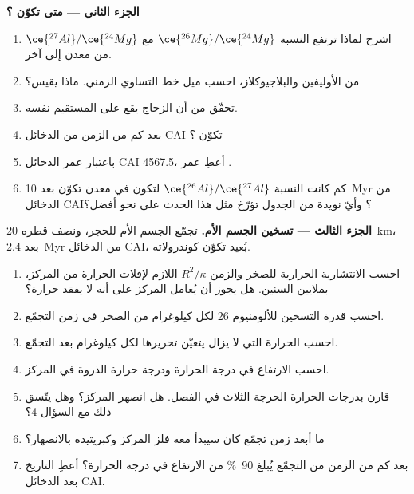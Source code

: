 \begin{problem}
\noindent\textbf{الجزء الثاني --- متى تكوّن ؟}
\begin{enumerate}[resume]
  \item اشرح لماذا ترتفع النسبة $\ce{^{26}Mg}/\ce{^{24}Mg}$ مع
        $\ce{^{27}Al}/\ce{^{24}Mg}$ من معدن إلى آخر.
  \item من الأوليفين والبلاجيوكلاز، احسب ميل خط التساوي الزمني.
        ماذا يقيس؟
  \item تحقّق من أن الزجاج يقع على المستقيم نفسه.
  \item بعد كم من الزمن من الدخائل CAI تكوّن ؟
  \item باعتبار عمر الدخائل CAI \qty{4567.5}{\Ma}، أعطِ عمر .
  \item كم كانت النسبة $\ce{^{26}Al}/\ce{^{27}Al}$ لتكون في معدن تكوّن
        بعد \qty{10}{Myr} من الدخائل CAI؟ وأيّ نويدة من الجدول تؤرّخ مثل هذا
        الحدث على نحو أفضل؟
\end{enumerate}

\noindent\textbf{الجزء الثالث --- تسخين الجسم الأم.}
تجمّع الجسم الأم للحجر، ونصف قطره \qty{20}{km}، بعد \qty{2.4}{Myr} من
الدخائل CAI، بُعيد تكوّن كوندرولاته.
\begin{enumerate}[resume]
  \item احسب الانتشارية الحرارية للصخر والزمن $R^2/\kappa$ اللازم
        لإفلات الحرارة من المركز، بملايين السنين. هل يجوز أن يُعامل المركز
        على أنه لا يفقد حرارة؟
  \item احسب قدرة التسخين للألومنيوم 26 لكل كيلوغرام من الصخر في زمن
        التجمّع.
  \item احسب الحرارة التي لا يزال يتعيّن تحريرها لكل كيلوغرام بعد التجمّع.
  \item احسب الارتفاع في درجة الحرارة ودرجة حرارة الذروة في المركز.
  \item قارن بدرجات الحرارة الحرجة الثلاث في الفصل. هل انصهر
        المركز؟ وهل يتّسق ذلك مع السؤال 4؟
  \item ما أبعد زمن تجمّع كان سيبدأ معه فلز المركز وكبريتيده
        بالانصهار؟
  \item بعد كم من الزمن من التجمّع يُبلغ \qty{90}{\percent} من الارتفاع في درجة
        الحرارة؟ أعطِ التاريخ بعد الدخائل CAI.
\end{enumerate}


\end{problem}
